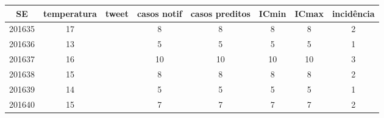 \begin{tabular}{c|ccccccc}
  \hline
SE & temperatura & tweet & casos notif & casos preditos & ICmin & ICmax & incidência \\ 
  \hline
201635 & 17 &  & 8 & 8 & 8 & 8 & 2 \\ 
  201636 & 13 &  & 5 & 5 & 5 & 5 & 1 \\ 
  201637 & 16 &  & 10 & 10 & 10 & 10 & 3 \\ 
  201638 & 15 &  & 8 & 8 & 8 & 8 & 2 \\ 
  201639 & 14 &  & 5 & 5 & 5 & 5 & 1 \\ 
  201640 & 15 &  & 7 & 7 & 7 & 7 & 2 \\ 
   \hline
\end{tabular}
